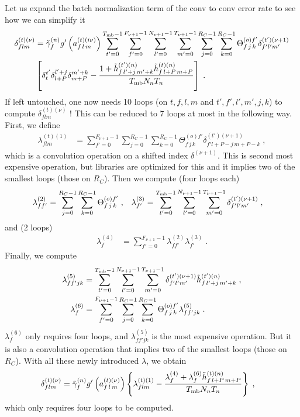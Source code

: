 \begin{subappendices}
Let us expand the batch normalization term of the conv to conv error rate to see how we can simplify it
\begin{align}
\delta^{(t)(\nu)}_{flm}&=\tilde{\gamma}^{(n)}_fg'\left(a_{f\,l\,m}^{(t)(i\nu)}\right)
%
\sum_{t'=0}^{T_{{\rm mb}}-1}\sum^{F_{\nu+1}-1}_{f'=0}\sum^{N_{\nu+1}-1}_{l'=0}\sum^{T_{\nu+1}-1}_{m'=0}
%
\sum^{R_C-1}_{j=0}\sum^{R_C-1}_{k=0}\Theta^{(o)f'}_{f\,j\,k}\delta_{f'l'm'}^{(t')(\nu+1)}\notag\\
%
&\left[\delta^{t'}_t\delta^{ l'+j}_{l+P}\delta^{m'+k}_{m+P}-
%
\frac{1+\tilde{h}_{f\, l'+j\,m'+k}^{(t')(n)}\tilde{h}_{f\,l+P\,m+P}^{(t)(n)}}{T_{{\rm mb}}N_nT_n}\right]\;.
\end{align}
If left untouched, one now needs 10 loops (on $t,f,l,m$ and $t',f',l',m',j,k$) to compute $\delta^{(t)(\nu)}_{flm}$ ! This can be reduced to 7 loops at most in the following way. First, we define
\begin{align}
\lambda^{(t)(1)}_{flm}&=\sum^{F_{\nu+1}-1}_{f'=0}\sum^{R_C-1}_{j=0}\sum^{R_C-1}_{k=0}
%
\Theta^{(o)f'}_{f\,j\,k}\delta_{f'l+P-j\,m+P-k}^{(t')(\nu+1)}\;,
\end{align}
which is a convolution operation on a shifted index $\delta^{(\nu+1)}$. This is second most expensive operation, but libraries are optimized for this and it implies two of the smallest loops (those on $R_C$). Then we compute (four loops each)
\begin{align}
\lambda^{(2)}_{ff'}&=\sum^{R_C-1}_{j=0}\sum^{R_C-1}_{k=0}\Theta^{(o)f'}_{f\,j\,k}\;,&
%
\lambda^{(3)}_{f'}&=\sum_{t'=0}^{T_{{\rm mb}}-1}\sum^{N_{\nu+1}-1}_{l'=0}\sum^{T_{\nu+1}-1}_{m'=0}
%
\delta_{f'l'm'}^{(t')(\nu+1)}\;,
\end{align}
and (2 loops)
\begin{align}
\lambda^{(4)}_{f}&=\sum^{F_{\nu+1}-1}_{f'=0}\lambda^{(2)}_{ff'}\lambda^{(3)}_{f'}\;.
\end{align}
Finally, we compute
\begin{align}
\lambda^{(5)}_{ff'jk}&=\sum_{t'=0}^{T_{{\rm mb}}-1}\sum^{N_{\nu+1}-1}_{l'=0}\sum^{T_{\nu+1}-1}_{m'=0}
%
\delta_{f'l'm'}^{(t')(\nu+1)}\tilde{h}_{f\, l'+j\,m'+k}^{(t')(n)}\;,\\
%
\lambda^{(6)}_{f}&=\sum^{F_{\nu+1}-1}_{f'=0}\sum^{R_C-1}_{j=0}\sum^{R_C-1}_{k=0}
%
\Theta^{(o)f'}_{f\,j\,k}\lambda^{(5)}_{ff'jk}\;.
\end{align}
$\lambda^{(6)}_{f}$ only requires four loops, and $\lambda^{(5)}_{ff'jk}$ is the  most expensive operation. But it is also a convolution operation that implies two of the smallest loops (those on $R_C$). With all these newly introduced $\lambda$, we obtain
\begin{align}
\delta^{(t)(\nu)}_{flm}&=\tilde{\gamma}^{(n)}_fg'\left(a_{f\,l\,m}^{(t)(\nu)}\right)\left\{
%
\lambda^{(t)(1)}_{flm}-
%
\frac{\lambda^{(4)}_{f}+\lambda^{(6)}_{f}\tilde{h}_{f\,l+P\,m+P}^{(t)(n)}}{T_{{\rm mb}}N_nT_n}\right\}\;,
\end{align}
which only requires four loops to be computed.


\end{subappendices}
